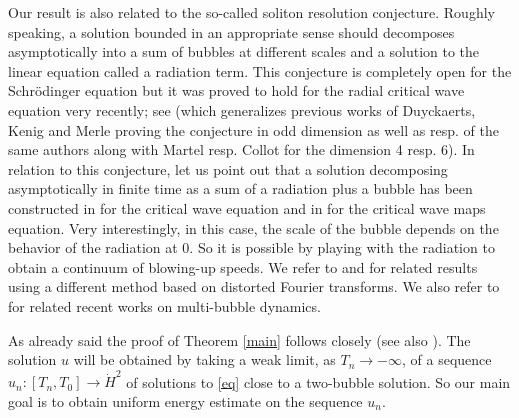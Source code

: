 \documentclass[a4paper,two-side,10pt]{amsart}
\numberwithin{equation}{section}
\begin{document}
Our result is also related to the so-called soliton resolution conjecture. Roughly speaking, a solution bounded in an appropriate sense should decomposes asymptotically into a sum of bubbles at different scales and a solution to the linear equation called a radiation term. This conjecture is completely open for the 
Schr\"odinger equation but it was proved to hold for the radial critical wave equation very recently; see \cite{JLsoli} (which generalizes previous works of Duyckaerts, Kenig and Merle \cite{DKMfirst,MR2972605,MR4163362,MR4289254,DKMActa} proving the conjecture in odd dimension as well as \cite{MR4397184} resp. \cite{CDKM} of the same authors along with Martel resp. Collot for the dimension 4 resp. 6). In relation to this conjecture, let us point out that a solution decomposing asymptotically in finite time as a sum of a radiation plus a bubble has been constructed in \cite{MR3579128} for the critical wave equation and in \cite{MR4458521} for the critical wave maps equation. Very interestingly, in this case, the  scale of the bubble depends on the behavior of the radiation at $0$. So it is possible by playing with the radiation to obtain a continuum of blowing-up speeds. We refer to \cite{MR2494455,MR2372807} and \cite{MR3114854} for related results using a different method based on distorted Fourier transforms. We also refer to \cite{CSZ,CoteDu,JM,Xu} for related recent works on multi-bubble dynamics.


As already said the proof of Theorem \ref{main} follows closely \cite{JJ} (see also \cite{raphael2011existence}). The solution $u$ will be obtained by taking a weak limit, as $T_n\to -\infty$, of a sequence $u_n :[T_n ,T_0]\rightarrow \dot{H}^2$ of solutions to \eqref{eq} %
close to a two-bubble solution. So our main goal is to obtain uniform energy estimate on the sequence $u_n$. 
\end{document}
